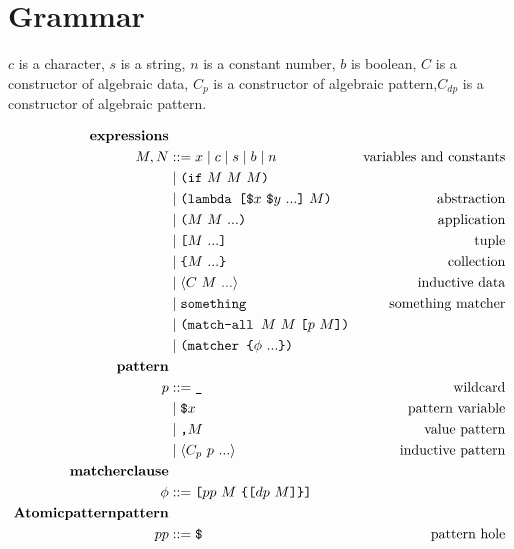 \documentclass[9pt, a4paper]{extarticle}
\theoremstyle{break}
\newcommand{\bt}[1]{{\texttt{#1}}}
\newcommand{\eif}[1]{\bt{(if}#1\bt{)}}
\newcommand{\elam}[2]{\bt{(lambda [}#1\bt{]} #2\bt{)}}
\newcommand{\eapp}[1]{\bt{(}#1\bt{)}}
\newcommand{\etup}[1]{\bt{[}#1\bt{]}}
\newcommand{\ecol}[1]{\bt{\{}#1\bt{\}}}
\newcommand{\eadt}[1]{{\bf{\langle}}#1{\bf{\rangle}}}
\newcommand{\elet}[1]{\bt{(let}#1\bt{)}}
\newcommand{\erec}[1]{\bt{(letrec}#1\bt{)}}
\newcommand{\esome}{\bt{something}}
\newcommand{\ematchall}[1]{\bt{(match-all } #1\bt{)}}
\newcommand{\ematch}[1]{\bt{(match } #1\bt{)}}
\newcommand{\ematcher}[1]{\bt{(matcher } #1\bt{)}}
\begin{document}
\section{Grammar}
\label{sec:egison-syntax}

$c$ is a character, $s$ is a string, $n$ is a constant number, $b$ is boolean,
$C$ is a constructor of algebraic data, $C_p$ is a constructor of algebraic
pattern,$C_{dp}$ is a constructor of algebraic pattern.

\begin{align*}
  {\bf{expressions}} & &\\
    M,N & ::=  x \mid c \mid s \mid b \mid n & \text{variables and constants}\\
      & \mid \eif{\ M\ M\ M} &\\
      & \mid \elam{{\bt{\$}}x\ \bt{\$}y\ ...}{\ M} & \text{abstraction}\\ 
      & \mid \eapp{M\ M\ ...} & \text{application}\\
      & \mid \etup{M\ ...} & \text{tuple}\\
      & \mid \ecol{M\ ...} & \text{collection}\\
      & \mid \eadt{C\ M\ ...} & \text{inductive data}\\
      & \mid \esome & \text{something matcher}\\
      & \mid \ematchall{M\ M\ \etup{p\ M}} & \\ 
      & \mid \ematcher{\ecol{\phi\ ...}} & \\
  {\bf{pattern}} & &\\
    p & ::= \bt{\_} & \text{wildcard}\\
      & \mid \bt{\$}x & \text{pattern variable}\\
      & \mid \bt{,}M & \text{value pattern}\\
      & \mid \eadt{C_p\ p\ ...} & \text{inductive pattern}\\
  {\bf{matcher clause}} & & \\
    \phi & ::= \etup{pp\ M\ \ecol{\etup{dp\ M}}} & \\
  {\bf{Atomic pattern pattern}} & & \\
    pp & ::= \bt{\$} & \text{pattern hole}\\ 

\end{align*}
\end{document}
